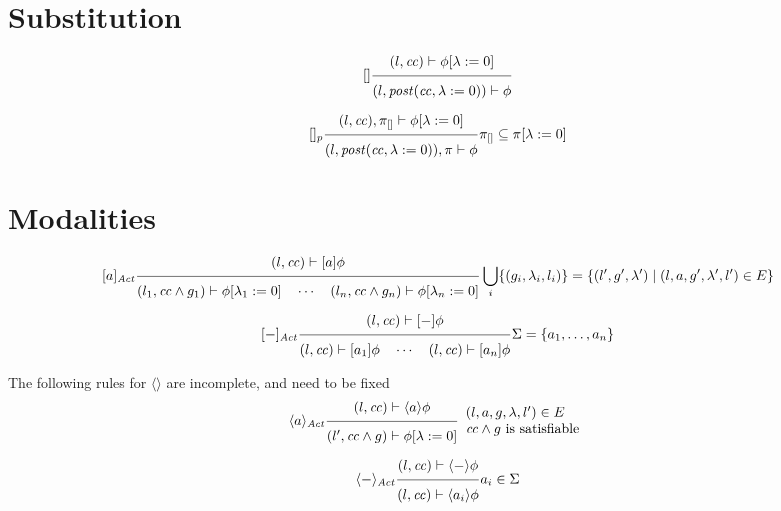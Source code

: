 \documentclass{article}
\newcommand{\proofrule}[3][]{#1 \frac{\raisebox{.7ex}{\normalsize{$#2$}}}
  {\raisebox{-1.0ex}{\normalsize{$#3$}}}}
\newcommand{\placeholder}[1][]{\pi_{#1}}
\newcommand{\loc}{l}
\newcommand{\region}{\mathit{cc}}
\newcommand{\suc}{\mathit{succ}}
\newcommand{\post}{\mathit{post}}
\begin{document}



\section{Substitution}

\[
\proofrule[{[]}]
{(\loc, \region) \vdash \phi[\lambda := 0]}
{(\loc, \post(\region, \lambda := 0)) \vdash \phi}
\]

\[
\proofrule[{[]_p}]
{(\loc, \region), \placeholder[{[]}] \vdash \phi[\lambda := 0]}
{(\loc, \post(\region, \lambda := 0)), \placeholder \vdash \phi}
\placeholder[{[]}] \subseteq \placeholder[][\lambda := 0]
\]

\section{Modalities}

\[
\proofrule[{[a]_{\mathit{Act}}}]
{(\loc, \region) \vdash [a]\phi}
{(\loc_1, \region \land g_1) \vdash \phi{[\lambda_1 := 0]}
\quad \cdots \quad
(\loc_n, \region \land g_n) \vdash \phi{[\lambda_n := 0]}
}
\bigcup_i \{ (g_i,\lambda_i,\loc_i) \} = \{ (\loc', g', \lambda') \mid (\loc, a, g', \lambda', \loc') \in E \}
\]

\[
\proofrule[{[-]_{\mathit{Act}}}]
{(\loc, \region) \vdash [-]\phi}
{(\loc, \region) \vdash [a_1]\phi
\quad \cdots \quad
(\loc, \region) \vdash [a_n]\phi}
\Sigma = \{ a_1, \ldots, a_n \}
\]


The following rules for $\langle \rangle$ are incomplete, and need to be fixed
\[
\proofrule[\langle a \rangle_{\mathit{Act}}]
{(\loc, \region) \vdash \langle a \rangle \phi}
{(\loc', \region \land g) \vdash \phi[\lambda := 0]}
\begin{array}{l}
(\loc, a, g, \lambda, \loc') \in E\\
\region \land g \text{ is satisfiable}
\end{array}
\]

\[
\proofrule[\langle - \rangle_{\mathit{Act}}]
{(\loc, \region) \vdash \langle - \rangle \phi}
{(\loc, \region) \vdash \langle a_i \rangle \phi}
a_i \in \Sigma
\]



\end{document}

